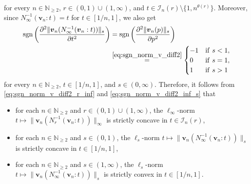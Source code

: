 \documentclass[conference, draftcls, onecolumn]{IEEEtran}
\theoremstyle{plain}
\newcommand{\bvec}[1]{\boldsymbol{#1}}
\newcommand{\sgn}{\operatorname{sgn}}
\newcommand{\lemref}[1]{Lemma~\ref{#1}}
\begin{document}
\begin{IEEEproof}[Proof of \lemref{lem:convex_v}]
for every $n \in \mathbb{N}_{\ge 2}$, $r \in (0, 1) \cup (1, \infty)$, and $t \in \mathcal{I}_{n}( r ) \setminus \{ 1, n^{\theta( r )} \}$.
Moreover, since $N_{\infty}^{-1}( \bvec{v}_{n} : t ) = t$ for $t \in [1/n, 1]$, we also get
\begin{align}
\sgn\bigg( \frac{ \partial^{2} \| \bvec{v}_{n}( N_{\infty}^{-1}( \bvec{v}_{n} : t ) ) \|_{s} }{ \partial t^{2} } \bigg)
& =
\sgn\bigg( \frac{ \partial^{2} \| \bvec{v}_{n}( p ) \|_{s} }{ \partial p^{2} } \bigg)
\\
& \overset{\eqref{eq:sgn_norm_v_diff2}}{=}
\begin{cases}
-1
& \mathrm{if} \ s < 1 ,
\\
0
& \mathrm{if} \ s = 1 ,
\\
1
& \mathrm{if} \ s > 1
\end{cases}
\label{eq:sgn_norm_v_diff2_inf_s}
\end{align}
for every $n \in \mathbb{N}_{\ge 2}$, $t \in [1/n, 1]$, and $s \in (0, \infty)$.
Therefore, it follows from \eqref{eq:sgn_norm_v_diff2_r_inf} and \eqref{eq:sgn_norm_v_diff2_inf_s} that
\begin{itemize}
\item
for each $n \in \mathbb{N}_{\ge 2}$ and $r \in (0, 1) \cup (1, \infty)$, the $\ell_{\infty}$-norm $t \mapsto \| \bvec{v}_{n}( N_{r}^{-1}( \bvec{v}_{n} : t ) ) \|_{\infty}$ is strictly concave in $t \in \mathcal{I}_{n}( r )$,
\item
for each $n \in \mathbb{N}_{\ge 2}$ and $s \in (0, 1)$, the $\ell_{s}$-norm $t \mapsto \| \bvec{v}_{n}( N_{\infty}^{-1}( \bvec{v}_{n} : t ) ) \|_{s}$ is strictly concave in $t \in [1/n, 1]$,
\item
for each $n \in \mathbb{N}_{\ge 2}$ and $s \in (1, \infty)$, the $\ell_{s}$-norm $t \mapsto \| \bvec{v}_{n}( N_{\infty}^{-1}( \bvec{v}_{n} : t ) ) \|_{s}$ is strictly convex in $t \in [1/n, 1]$.
\end{itemize}




\end{IEEEproof}
\end{document}
